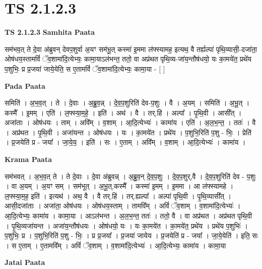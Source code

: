 \documentclass[17pt]{extarticle}
\begin{document}
\section{ TS 2.1.2.3 }

\textbf{TS 2.1.2.3 } \newline
\textbf{Samhita Paata} \newline

सम॑भव॒त् ते दे॒वा अ॑ब्रुवन् देवप॒शुर्वा अ॒यꣳ सम॑भू॒त् कस्मा॑ इ॒ममा ल॑फ्स्यामह॒ इत्यथ॒ वै तर्ह्यल्पा॑ पृथि॒व्यासी॒-दजा॑ता॒ ओष॑धय॒स्तामविं॑ ॅव॒शामा॑दि॒त्येभ्यः॒ कामा॒याऽल॑भन्त॒ ततो॒ वा अप्र॑थत पृथि॒व्य-जा॑य॒न्तौष॑धयो॒ यः का॒मये॑त॒ प्रथे॑य प॒शुभिः॒ प्र प्र॒जया॑ जाये॒येति॒ स ए॒तामविं॑ ॅव॒शामा॑दि॒त्येभ्यः॒ कामा॒या - [  ] \newline

\textbf{Pada Paata} \newline

समिति॑ । अ॒भ॒व॒त् । ते । दे॒वाः । अ॒ब्रु॒व॒न्न् । दे॒व॒प॒शुरिति॑ देव-प॒शुः । वै । अ॒यम् । समिति॑ । अ॒भू॒त् । कस्मै᳚ । इ॒मम् । एति॑ । ल॒फ्स्या॒म॒हे॒ । इति॑ । अथ॑ । वै । तर्.हि॑ । अल्पा᳚ । पृ॒थि॒वी । आसी᳚त् । अजा॑ताः । ओष॑धयः । ताम् । अवि᳚म् । व॒शाम् । आ॒दि॒त्येभ्यः॑ । कामा॑य । एति॑ । अ॒ल॒भ॒न्त॒ । ततः॑ । वै । अप्र॑थत । पृ॒थि॒वी । अजा॑यन्त । ओष॑धयः । यः । का॒मये॑त । प्रथे॑य । प॒शुभि॒रिति॑ प॒शु - भिः॒ । प्रेति॑ । प्र॒जयेति॑ प्र - जया᳚ । जा॒ये॒य॒ । इति॑ । सः । ए॒ताम् । अवि᳚म् । व॒शाम् । आ॒दि॒त्येभ्यः॑ । कामा॑य ।  \newline


\textbf{Krama Paata} \newline

सम॑भवत् । अ॒भ॒व॒त् ते । ते दे॒वाः । दे॒वा अ॑ब्रुवन्न् । अ॒ब्रु॒व॒न् दे॒व॒प॒शुः । दे॒व॒प॒शुर्,वै । दे॒व॒प॒शुरिति॑ देव - प॒शुः । वा अ॒यम् । अ॒यꣳ सम् । सम॑भूत् । अ॒भू॒त्,कस्मै᳚ । कस्मा॑ इ॒मम् । इ॒ममा । आ ल॑फ्स्यामहे । ल॒फ्स्या॒म॒ह॒ इति॑ । इत्यथ॑ । अथ॒ वै । वै तर्.हि॑ । तर्.ह्यल्पा᳚ । अल्पा॑ पृथि॒वी । पृ॒थि॒व्यासी᳚त् । आसी॒दजा॑ताः । अजा॑ता॒ ओष॑धयः । ओष॑धय॒स्ताम् । तामवि᳚म् । अविं॑ ॅव॒शाम् । व॒शामा॑दि॒त्येभ्यः॑ । आ॒दि॒त्येभ्यः॒ कामा॑य । कामा॒या । आऽल॑भन्त । अ॒ल॒भ॒न्त॒ ततः॑ । ततो॒ वै । वा अप्र॑थत । अप्र॑थत पृथि॒वी । पृ॒थि॒व्यजा॑यन्त । अजा॑य॒न्तौष॑धयः । ओष॑धयो॒ यः । यः का॒मये॑त । का॒मये॑त॒ प्रथे॑य । प्रथे॑य प॒शुभिः॑ । प॒शुभिः॒ प्र । प॒शुभि॒रिति॑ प॒शु - भिः॒ । प्र प्र॒जया᳚ । प्र॒जया॑ जायेय । प्र॒जयेति॑ प्र - जया᳚ । जा॒ये॒येति॑ । इति॒ सः । स ए॒ताम् । ए॒तामवि᳚म् । अविं॑ ॅव॒शाम् । व॒शामा॑दि॒त्येभ्यः॑ । आ॒दि॒त्येभ्यः॒ कामा॑य । कामा॒या \newline

\textbf{Jatai Paata} \newline
\end{document}
